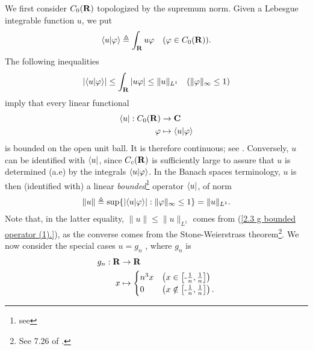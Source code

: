 We first consider %
%
  $C_0({\mathbf R})$ %
%
topologized by the supremum norm. %
Given a Lebesgue integrable function $u$, we put %
  \begin{align}
    \bra{u}\ket{\varphi} 
      \triangleq 
    \int_{\mathbf R} u\varphi  
      \quad(\varphi \in C_0({\mathbf R})).
  \end{align}
%
The following inequalities %
%
  \begin{align}\label{2.3  g  bounded operator (1).}
    \left\lvert\bra{u}\ket{\varphi}\right\rvert 
      \leq 
    \int_{\mathbf R} \left\lvert u\varphi \right\rvert 
      \leq
    \| u \|_{L^1}
      \quad(\|\varphi\|_\infty \leq 1)
  \end{align} 
%
imply that every linear functional 
%
  \begin{align}
    \bra{u}: C_0({\mathbf R}) &\to {\mathbf C} \\
             \varphi    &\mapsto \bra{u}\ket{\varphi} \nonumber
  \end{align}
is bounded on the open unit ball. It is therefore continuous; %
%
  see . %
%
Conversely, ${u}$ can be identified with %
%
  $\bra{u}$, %
%
since $C_c({\mathbf R})$ is sufficiently large to assure that $u$ is determined %
(a.e) by the integrals %
%
  $\bra{u}\ket{\varphi}$. %
%
In the Banach spaces terminology, 
% 
  $u$ is then (identified with) a linear \textit{bounded}\hspace{2pt}\footnote{
    see 
  } %
operator $\bra{u}$, of norm %
%
  \begin{align}\label{2.3  g  bounded operator (2).}
    \| u \| \triangleq 
    \sup\{
      \left\lvert \bra{u}\ket{\varphi} \right\rvert
    :  
      \| \varphi \|_\infty \leq 1
    \} =  \| u \|_{L^1}.
  \end{align} 
%
Note that, in the latter equality, $\|u\| \leq \| u \|_{L^1}$ comes from %
%
  (\ref{2.3  g  bounded operator (1).}), %
%
as the converse comes from the Stone-Weierstrass theorem\footnote{
%
  See 7.26 of \cite{BabyRudin}.
}. %
%
We now consider the special cases %
%
  $u = g_n$ %
%
, where $g_n$ is %
%
  \begin{align}
    g_n : {\mathbf R} & \to {\mathbf R}\\
           x & \mapsto \begin{cases} 
  n^3 x & \left(x \in    \left[\text{\small{-}} \frac{1}{n}, \frac{1}{n}\right]\right)\\
  0     & \left(x \notin \left[\text{\small{-}} \frac{1}{n}, \frac{1}{n}\right]\right).
  \end{cases}\nonumber
  \end{align}
